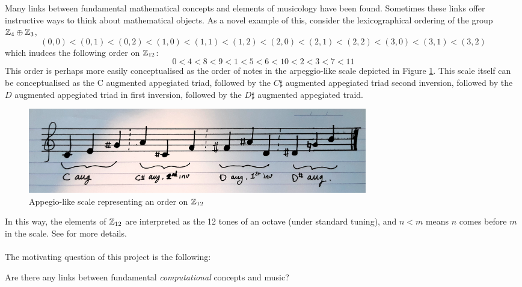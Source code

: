 Many links between fundamental mathematical concepts and elements of musicology have been found. Sometimes these links offer instructive ways to think about mathematical objects. As a novel example of this, consider the lexicographical ordering of the group $\mathbb{Z}_4 \oplus \mathbb{Z}_3$,
\[(0,0) < (0,1) < (0,2) < (1,0) < (1,1) < (1,2) < (2,0) < (2,1) < (2,2) < (3,0)< (3,1) < (3,2)\]
which inudces the following order on $\mathbb{Z}_{12}$:
\begin{equation}
\label{ordering}
0 < 4 < 8 < 9 < 1 < 5 <6 < 10 < 2 < 3 < 7 < 11
\end{equation}
This order is perhaps more easily conceptualised as the order of notes in the arpeggio-like scale depicted in Figure \ref{appegiolike}. This scale itself can be conceptualised as the C augmented appegiated triad, followed by the $C\sharp$ augmented appegiated triad second inversion, followed by the $D$ augmented appegiated triad in first inversion, followed by the $D\sharp$ augmented appegiated traid.
\begin{figure}[h]
\label{appegiolike}
 \centering
 \includegraphics[width=40em]{Pictures/AppegioLikeScale.png}
 \caption{Appegio-like scale representing an order on $\mathbb{Z}_{12}$}
\end{figure}
In this way, the elements of $\mathbb{Z}_{12}$ are interpreted as the 12 tones of an octave (under standard tuning), and $n < m$ means $n$ comes before $m$ in the scale. See \cite[\S6.8.1]{Mazzola} for more details.\\\\
%
The motivating question of this project is the following:
\begin{question}
 Are there any links between fundamental \emph{computational} concepts and music?
\end{question}
